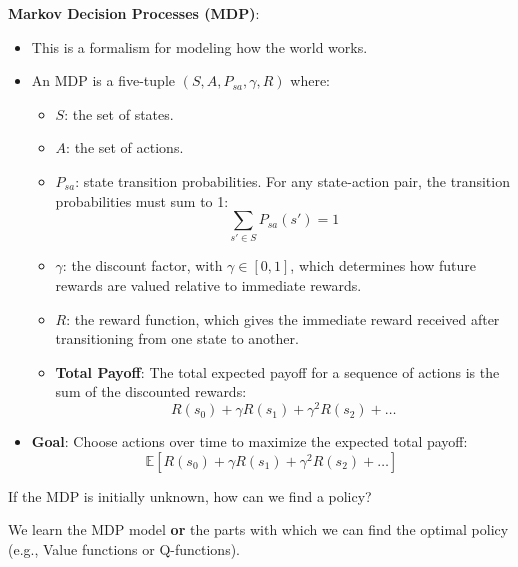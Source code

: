     \begin{example}
        \textbf{Markov Decision Processes (MDP)}:
        \begin{itemize}
            \item This is a formalism for modeling how the world works.
            
            \item An MDP is a five-tuple \( (S, A, P_{sa}, \gamma, R) \) where:
            \begin{itemize}
                \item \( S \): the set of states.
                \item \( A \): the set of actions.
                \item \( P_{sa} \): state transition probabilities. For any state-action pair, the transition probabilities must sum to 1:
                \[
                \sum_{s' \in S} P_{sa}(s') = 1
                \]
                \item \( \gamma \): the discount factor, with \( \gamma \in [0, 1] \), which determines how future rewards are valued relative to immediate rewards.
                \item \( R \): the reward function, which gives the immediate reward received after transitioning from one state to another.
                \item \textbf{Total Payoff}: The total expected payoff for a sequence of actions is the sum of the discounted rewards:
                \[
                R(s_0) + \gamma R(s_1) + \gamma^2 R(s_2) + \dots
                \]
            \end{itemize}
            
            \item \textbf{Goal}: Choose actions over time to maximize the expected total payoff:
            \[
            \mathbb{E}\left[R(s_0) + \gamma R(s_1) + \gamma^2 R(s_2) + \dots \right]
            \]
        \end{itemize}
    \end{example}

    \begin{warning}
        If the MDP is initially unknown, how can we find a policy?

        We learn the MDP model \textbf{or} the parts with which we can find the optimal policy (e.g., Value functions or Q-functions).
    \end{warning}


